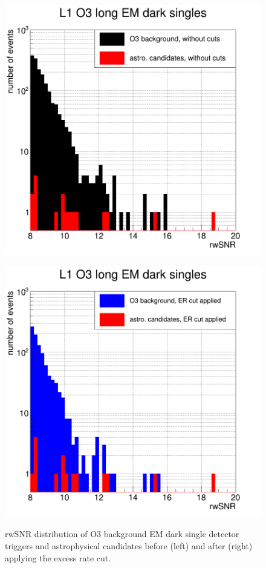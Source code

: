 \begin{figure}[hb]
  \centering
  \begin{minipage}{0.45\linewidth}
    \centering
    \includegraphics[width=\linewidth]{sectionSelection/plotsEMdark/cL1_O3_beforeCut.png}
    \label{fig:emdark_astro_beforecutER}
  \end{minipage}
  \hfill
  \begin{minipage}{0.45\linewidth}
    \centering
    \includegraphics[width=\linewidth]{sectionSelection/plotsEMdark/cL1_O3_afterCutER.png}
    \label{fig:emdark_astro_anyERonly}
  \end{minipage}
  \hfill
  \caption{rwSNR distribution of O3 background EM dark single detector triggers and astrophysical candidates before (left) and after (right) applying the excess rate cut.}
  \label{fig:emdark_astro_ercut}
\end{figure}
